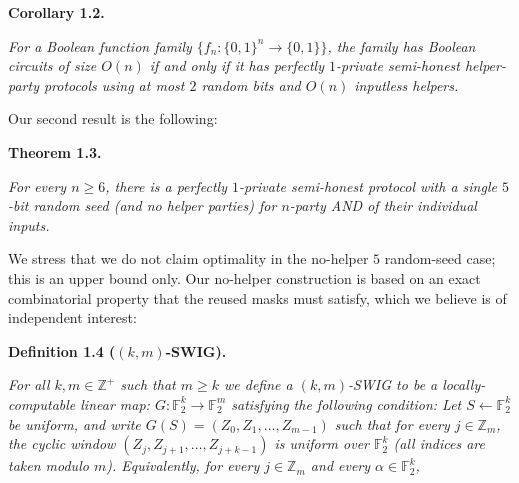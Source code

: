 \documentclass[10pt,a4paper]{article}
\begin{document}
\par\medskip\noindent\textbf{
\textbf{Corollary 1.2}\textbf{.}
}\par



\emph{For a Boolean function family $\{f_{n}:\{0,1\}^{n}\to\{0,1\}\}$, the family has Boolean circuits of size $O(n)$ if and only if it has perfectly $1$-private semi-honest helper-party protocols using at most $2$ random bits and $O(n)$ inputless helpers.}\par






Our second result is the following:\par





\par\medskip\noindent\textbf{
\textbf{Theorem 1.3}\textbf{.}
}\par



\emph{For every $n\geq 6$, there is a perfectly $1$-private semi-honest protocol with a single $5$-bit random seed (and no helper parties) for $n$-party AND of their individual inputs.}\par






We stress that we do not claim optimality in the no-helper $5$ random-seed case; this is an upper bound only.
Our no-helper construction is based on an exact combinatorial property that the reused masks must satisfy, which we believe is of independent interest:\par





\par\medskip\noindent\textbf{
\textbf{Definition 1.4}\textbf{ }($(k,m)$-SWIG)\textbf{.}
}\par



\emph{For all $k,m\in\mathbb{Z}^{+}$ such that $m\geq k$ we define a $(k,m)$-SWIG to be a locally-computable linear map:
$G:\mathbb{F}_{2}^{k}\to\mathbb{F}_{2}^{m}$
satisfying the following condition: Let $S\leftarrow\mathbb{F}_{2}^{k}$ be uniform, and write
$G(S)=(Z_{0},Z_{1},\ldots,Z_{m-1})$
such that for every $j\in\mathbb{Z}_{m}$, the cyclic window
$(Z_{j},Z_{j+1},\ldots,Z_{j+k-1})$
is uniform over $\mathbb{F}_{2}^{k}$ (all indices are taken modulo $m$). Equivalently, for every $j\in\mathbb{Z}_{m}$ and every $\alpha\in\mathbb{F}_{2}^{k}$,}\par
\end{document}
